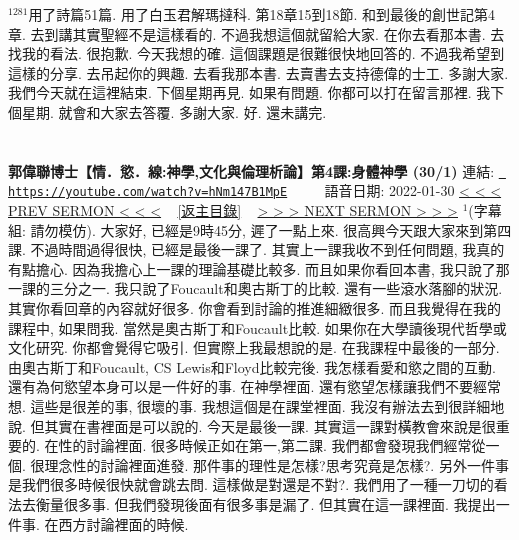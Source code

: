 \documentclass{book}
\begin{document}
$^{1281}$用了詩篇51篇.
用了白玉君解瑪撻科.
第18章15到18節.
和到最後的創世記第4章.
去到講其實聖經不是這樣看的.
不過我想這個就留給大家.
在你去看那本書.
去找我的看法.
很抱歉.
今天我想的確.
這個課題是很難很快地回答的.
不過我希望到這樣的分享.
去吊起你的興趣.
去看我那本書.
去賣書去支持德偉的士工.
多謝大家.
我們今天就在這裡結束.
下個星期再見.
如果有問題.
你都可以打在留言那裡.
我下個星期.
就會和大家去答覆.
多謝大家.
好.
還未講完.
\newpage



\section{}
\label{sec:hNm147B1MpE}
\textbf{郭偉聯博士【情．慾．線:神學,文化與倫理析論】第4課:身體神學 (30/1)}
\newline
\newline
連結: \href{https://youtube.com/watch?v=hNm147B1MpE}{\texttt{ https://youtube.com/watch?v=hNm147B1MpE}} ~~~~ 語音日期: 2022-01-30 
\newline
\newline
\hyperref[sec:wqj8hNAtWGc]{\small{< < < PREV SERMON < < <}}
~
\hyperref[sec:index]{\small{[返主目錄]}}
~
\hyperref[sec:zhKDWS7eHdY]{\small{> > > NEXT SERMON > > >}}
\newline
\newline
$^{1}$(字幕組: 請勿模仿).
大家好, 已經是9時45分, 遲了一點上來.
很高興今天跟大家來到第四課.
不過時間過得很快, 已經是最後一課了.
其實上一課我收不到任何問題, 我真的有點擔心.
因為我擔心上一課的理論基礎比較多.
而且如果你看回本書, 我只說了那一課的三分之一.
我只說了Foucault和奧古斯丁的比較.
還有一些滾水落腳的狀況.
其實你看回章的內容就好很多.
你會看到討論的推進細緻很多.
而且我覺得在我的課程中, 如果問我.
當然是奧古斯丁和Foucault比較.
如果你在大學讀後現代哲學或文化研究.
你都會覺得它吸引.
但實際上我最想說的是.
在我課程中最後的一部分.
由奧古斯丁和Foucault, CS Lewis和Floyd比較完後.
我怎樣看愛和慾之間的互動.
還有為何慾望本身可以是一件好的事.
在神學裡面.
還有慾望怎樣讓我們不要經常想.
這些是很差的事, 很壞的事.
我想這個是在課堂裡面.
我沒有辦法去到很詳細地說.
但其實在書裡面是可以說的.
今天是最後一課.
其實這一課對橫教會來說是很重要的.
在性的討論裡面.
很多時候正如在第一,第二課.
我們都會發現我們經常從一個.
很理念性的討論裡面進發.
那件事的理性是怎樣?思考究竟是怎樣?.
另外一件事是我們很多時候很快就會跳去問.
這樣做是對還是不對?.
我們用了一種一刀切的看法去衡量很多事.
但我們發現後面有很多事是漏了.
但其實在這一課裡面.
我提出一件事.
在西方討論裡面的時候.
\end{document}
